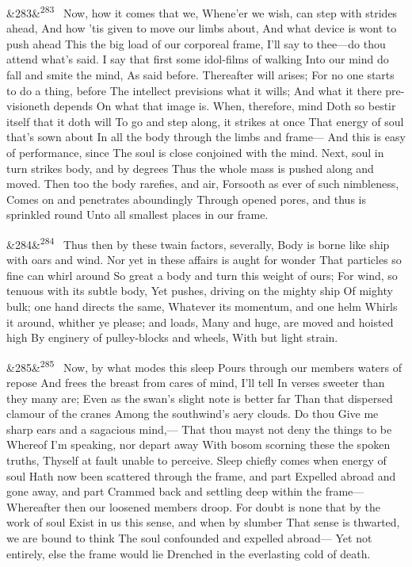 \documentclass[12pt]{article}
\newcommand{\para}[1][]{\par\noindent\ifx&#1&\else\textsuperscript{\footnotesize #1}~\fi}
\begin{document}
\para[283] Now, how it comes that we, Whene'er we wish, can step with strides ahead, And how 'tis given to move our limbs about, And what device is wont to push ahead This the big load of our corporeal frame, I'll say to thee---do thou attend what's said. I say that first some idol-films of walking Into our mind do fall and smite the mind, As said before. Thereafter will arises; For no one starts to do a thing, before The intellect previsions what it wills; And what it there pre-visioneth depends On what that image is. When, therefore, mind Doth so bestir itself that it doth will To go and step along, it strikes at once That energy of soul that's sown about In all the body through the limbs and frame--- And this is easy of performance, since The soul is close conjoined with the mind. Next, soul in turn strikes body, and by degrees Thus the whole mass is pushed along and moved. Then too the body rarefies, and air, Forsooth as ever of such nimbleness, Comes on and penetrates aboundingly Through opened pores, and thus is sprinkled round Unto all smallest places in our frame.

\para[284] Thus then by these twain factors, severally, Body is borne like ship with oars and wind. Nor yet in these affairs is aught for wonder That particles so fine can whirl around So great a body and turn this weight of ours; For wind, so tenuous with its subtle body, Yet pushes, driving on the mighty ship Of mighty bulk; one hand directs the same, Whatever its momentum, and one helm Whirls it around, whither ye please; and loads, Many and huge, are moved and hoisted high By enginery of pulley-blocks and wheels, With but light strain.

\para[285] Now, by what modes this sleep Pours through our members waters of repose And frees the breast from cares of mind, I'll tell In verses sweeter than they many are; Even as the swan's slight note is better far Than that dispersed clamour of the cranes Among the southwind's aery clouds. Do thou Give me sharp ears and a sagacious mind,--- That thou mayst not deny the things to be Whereof I'm speaking, nor depart away With bosom scorning these the spoken truths, Thyself at fault unable to perceive. Sleep chiefly comes when energy of soul Hath now been scattered through the frame, and part Expelled abroad and gone away, and part Crammed back and settling deep within the frame--- Whereafter then our loosened members droop. For doubt is none that by the work of soul Exist in us this sense, and when by slumber That sense is thwarted, we are bound to think The soul confounded and expelled abroad--- Yet not entirely, else the frame would lie Drenched in the everlasting cold of death.
\end{document}
